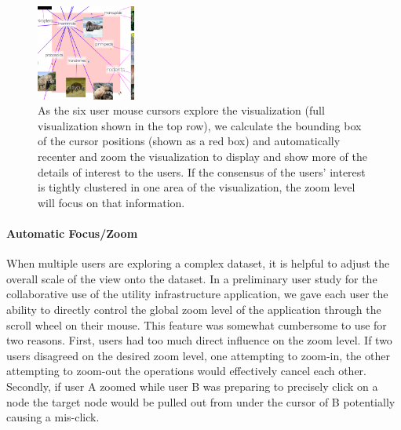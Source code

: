 \documentclass[runningheads,a4paper]{llncs}
\begin{document}
\begin{figure}[t]
 \includegraphics[width=0.29\textwidth]{images/autozoom_small_red_smaller.png}%

\vspace{-0.1in}
 \caption{\label{figure:crop_zoom} 
As the six user mouse cursors explore the visualization (full
visualization shown in the top row), we calculate the bounding box of
the cursor positions (shown as a red box) and automatically recenter
and zoom the visualization to display and show more of the details of
interest to the users.  If the consensus of the users' interest is
tightly clustered in one area of the visualization, the zoom level
will focus on that information.
\vspace{-0.1in}
}
\end{figure}

\vspace{-0.1in}
\paragraph{\bf Automatic Focus/Zoom}
When multiple users are exploring a complex dataset, it is helpful to
adjust the overall scale of the view onto the dataset.  In a
preliminary user study for the collaborative use of the utility
infrastructure application, we gave each user the ability to directly
control the global zoom level of the application through the scroll
wheel on their mouse.  This feature was somewhat cumbersome to use for
two reasons.  First, users had too much direct influence on the zoom
level.  If two users disagreed on the desired zoom level, one
attempting to zoom-in, the other attempting to zoom-out the operations
would effectively cancel each other.  Secondly, if user A zoomed while
user B was preparing to precisely click on a node the target node
would be pulled out from under the cursor of B potentially causing a
mis-click.
\end{document}
